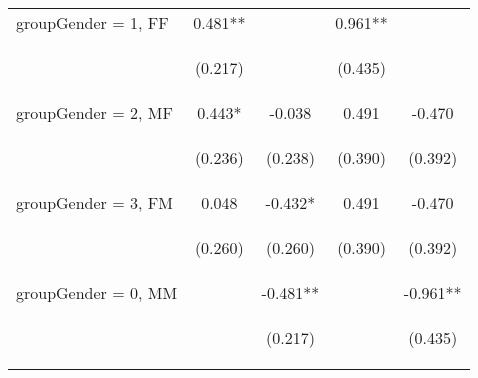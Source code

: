 \begin{center}
\begin{tabular}{lcccc}
groupGender = 1, FF & 0.481** &  & 0.961** &  \\
\vspace{4pt} & \begin{footnotesize}(0.217)\end{footnotesize} & \begin{footnotesize}\end{footnotesize} & \begin{footnotesize}(0.435)\end{footnotesize} & \begin{footnotesize}\end{footnotesize} \\
groupGender = 2, MF & 0.443* & -0.038 & 0.491 & -0.470 \\
\vspace{4pt} & \begin{footnotesize}(0.236)\end{footnotesize} & \begin{footnotesize}(0.238)\end{footnotesize} & \begin{footnotesize}(0.390)\end{footnotesize} & \begin{footnotesize}(0.392)\end{footnotesize} \\
groupGender = 3, FM & 0.048 & -0.432* & 0.491 & -0.470 \\
\vspace{4pt} & \begin{footnotesize}(0.260)\end{footnotesize} & \begin{footnotesize}(0.260)\end{footnotesize} & \begin{footnotesize}(0.390)\end{footnotesize} & \begin{footnotesize}(0.392)\end{footnotesize} \\
groupGender = 0, MM &  & -0.481** &  & -0.961** \\
\vspace{4pt} & \begin{footnotesize}\end{footnotesize} & \begin{footnotesize}(0.217)\end{footnotesize} & \begin{footnotesize}\end{footnotesize} & \begin{footnotesize}(0.435)\end{footnotesize} \\

\end{tabular}
\end{center}
